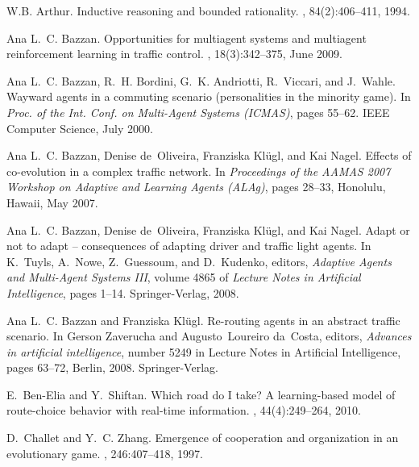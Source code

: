 \documentclass{RITA}
\begin{document}

\begin{thebibliography}{10}

W.B. Arthur.
\newblock Inductive reasoning and bounded rationality.
, 84(2):406--411, 1994.

Ana L.~C. Bazzan.
\newblock Opportunities for multiagent systems and multiagent reinforcement
  learning in traffic control.
, 18(3):342--375, June
  2009.

Ana L.~C. Bazzan, R.~H. Bordini, G.~K. Andriotti, R.~Viccari, and J.~Wahle.
\newblock Wayward agents in a commuting scenario (personalities in the minority
  game).
\newblock In {\em Proc. of the Int. Conf. on Multi-Agent Systems {(ICMAS)}},
  pages 55--62. {IEEE} Computer Science, July 2000.

Ana L.~C. Bazzan, Denise de~Oliveira, Franziska Kl\"ugl, and Kai Nagel.
\newblock Effects of co-evolution in a complex traffic network.
\newblock In {\em Proceedings of the {AAMAS} 2007 Workshop on Adaptive and
  Learning Agents ({ALA}g)}, pages 28--33, Honolulu, Hawaii, May 2007.

Ana L.~C. Bazzan, Denise de~Oliveira, Franziska Kl\"ugl, and Kai Nagel.
\newblock Adapt or not to adapt -- consequences of adapting driver and traffic
  light agents.
\newblock In K.~Tuyls, A.~Nowe, Z.~Guessoum, and D.~Kudenko, editors, {\em
  Adaptive Agents and Multi-Agent Systems III}, volume 4865 of {\em Lecture
  Notes in Artificial Intelligence}, pages 1--14. Springer-Verlag, 2008.

Ana L.~C. Bazzan and Franziska Kl\"ugl.
\newblock Re-routing agents in an abstract traffic scenario.
\newblock In Gerson Zaverucha and Augusto~Loureiro da~Costa, editors, {\em
  Advances in artificial intelligence}, number 5249 in Lecture Notes in
  Artificial Intelligence, pages 63--72, Berlin, 2008. Springer-Verlag.

E.~Ben-Elia and Y.~Shiftan.
\newblock Which road do {I} take? {A} learning-based model of route-choice
  behavior with real-time information.
,
  44(4):249--264, 2010.

D.~Challet and Y.~C. Zhang.
\newblock Emergence of cooperation and organization in an evolutionary game.
, 246:407--418, 1997.


\end{thebibliography}
\end{document}
